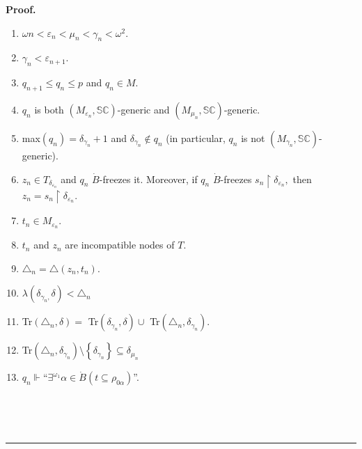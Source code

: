 \documentclass{article}
\newenvironment{proof}[1][Proof]{\noindent\textbf{#1.} }{\ \rule{0.5em}{0.5em}}
\begin{document}
\begin{proof}
\begin{enumerate}
\item $\omega n<\varepsilon_{n}<\mu_{n}<\gamma_{n}<\omega^{2}.$

\item $\gamma_{n}<\varepsilon_{n+1}.$

\item $q_{n+1}\leq q_{n}\leq p$ and $q_{n}\in M.$

\item $q_{n}$ is both $(M_{\varepsilon_{n}},\mathbb{SC})$-generic and
$(M_{\mu_{n}},\mathbb{SC})$-generic.

\item \textsf{max}$\left(  q_{n}\right)  =\delta_{\gamma_{n}}+1$ and
$\delta_{\gamma_{n}}\notin q_{n}$ (in particular, $q_{n}$ is not
$(M_{\gamma_{n}},\mathbb{SC})$-generic).

\item $z_{n}\in T_{\delta_{\varepsilon_{n}}}$ and $q_{n}$ $\dot{B}$-freezes
it. Moreover, if $q_{n}$ $\dot{B}$-freezes $s_{n}\upharpoonright
\delta_{\varepsilon_{n}},$ then $z_{n}=s_{n}\upharpoonright\delta
_{\varepsilon_{n}}.$

\item $t_{n}\in M_{\varepsilon_{n}}.$

\item $t_{n}$ and $z_{n}$ are incompatible nodes of $T.$

\item $\triangle_{n}=\triangle\left(  z_{n},t_{n}\right)  $.

\item $\lambda\left(  \delta_{\gamma_{n},}\delta\right)  <\triangle_{n}$

\item \textsf{Tr}$(\triangle_{n},\delta)=$ \textsf{Tr}$(\delta_{\gamma_{n}%
},\delta)\cup$ \textsf{Tr}$(\triangle_{n},\delta_{\gamma_{n}}).$

\item \textsf{Tr}$(\triangle_{n},\delta_{\gamma_{n}})\setminus\left\{
\delta_{\gamma_{n}}\right\}  \subseteq\delta_{\mu_{n}}$

\item $q_{n}\Vdash$\textquotedblleft$\exists^{\omega_{1}}\alpha\in\dot
{B}\left(  t\subseteq\rho_{0\alpha}\right)  $\textquotedblright.
\end{enumerate}

\qquad\ \ \ \ \qquad\ \qquad\ \ \ \ \ \ 


\end{proof}
\end{document}
